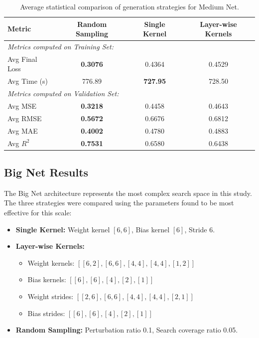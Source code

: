 \begin{table}[h]
\centering
\scriptsize
\begin{tabular}{|l|c|c|c|}
\hline
\textbf{Metric} & \textbf{Random Sampling} & \textbf{Single Kernel} & \textbf{Layer-wise Kernels} \\ \hline
\multicolumn{4}{|l|}{\textit{Metrics computed on Training Set:}} \\ \hline
Avg Final Loss        & \textbf{0.3076}                       & 0.4364                 & 0.4529                      \\ \hline
Avg Time (s)          & 776.89                       & \textbf{727.95}                 & 728.50                      \\ \hline
\multicolumn{4}{|l|}{\textit{Metrics computed on Validation Set:}} \\ \hline
Avg MSE               & \textbf{0.3218}                       & 0.4458                 & 0.4643                      \\ \hline
Avg RMSE              & \textbf{0.5672}                       & 0.6676                 & 0.6812                      \\ \hline
Avg MAE               & \textbf{0.4002}                       & 0.4780                 & 0.4883                      \\ \hline
Avg $R^2$             & \textbf{0.7531}                       & 0.6580                 & 0.6438                      \\ \hline
\end{tabular}
\caption{Average statistical comparison of generation strategies for Medium Net.}
\label{tab:medium_net_comp_results}
\end{table}

\newpage

\subsection{Big Net Results}

The Big Net architecture represents the most complex search space in this study. The three strategies were compared using the parameters found to be most effective for this scale:
\begin{itemize}
    \item \textbf{Single Kernel:} Weight kernel $[6,6]$, Bias kernel $[6]$, Stride 6.
    \item \textbf{Layer-wise Kernels:} 
        \begin{itemize}
            \item Weight kernels: $[[6,2], [6,6], [4,4], [4,4], [1,2]]$
            \item Bias kernels: $[[6], [6], [4], [2], [1]]$
            \item Weight strides: $[[2,6], [6,6], [4,4], [4,4], [2,1]]$
            \item Bias strides: $[[6], [6], [4], [2], [1]]$
        \end{itemize}
    \item \textbf{Random Sampling:} Perturbation ratio 0.1, Search coverage ratio 0.05.
\end{itemize}


